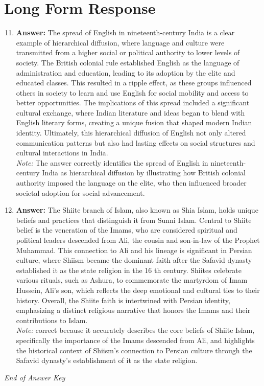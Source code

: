 \documentclass[12pt]{article}
\begin{document}
\section*{Long Form Response}
\begin{enumerate}[label=\arabic*.]
\setcounter{enumi}{10}
\item \textbf{Answer:} The spread of English in nineteenth-century India is a clear example of hierarchical diffusion, where language and culture were transmitted from a higher social or political authority to lower levels of society. The British colonial rule established English as the language of administration and education, leading to its adoption by the elite and educated classes. This resulted in a ripple effect, as these groups influenced others in society to learn and use English for social mobility and access to better opportunities. The implications of this spread included a significant cultural exchange, where Indian literature and ideas began to blend with English literary forms, creating a unique fusion that shaped modern Indian identity. Ultimately, this hierarchical diffusion of English not only altered communication patterns but also had lasting effects on social structures and cultural interactions in India.
\\ \textit{Note:} The answer correctly identifies the spread of English in nineteenth-century India as hierarchical diffusion by illustrating how British colonial authority imposed the language on the elite, who then influenced broader societal adoption for social advancement.
\item \textbf{Answer:} The Shiite branch of Islam, also known as Shia Islam, holds unique beliefs and practices that distinguish it from Sunni Islam. Central to Shiite belief is the veneration of the Imams, who are considered spiritual and political leaders descended from Ali, the cousin and son-in-law of the Prophet Muhammad. This connection to Ali and his lineage is significant in Persian culture, where Shiism became the dominant faith after the Safavid dynasty established it as the state religion in the 16 th century. Shiites celebrate various rituals, such as Ashura, to commemorate the martyrdom of Imam Hussein, Ali's son, which reflects the deep emotional and cultural ties to their history. Overall, the Shiite faith is intertwined with Persian identity, emphasizing a distinct religious narrative that honors the Imams and their contributions to Islam.
\\ \textit{Note:} correct because it accurately describes the core beliefs of Shiite Islam, specifically the importance of the Imams descended from Ali, and highlights the historical context of Shiism's connection to Persian culture through the Safavid dynasty's establishment of it as the state religion.
\end{enumerate}

\vfill
\noindent\textit{End of Answer Key}
\end{document}
